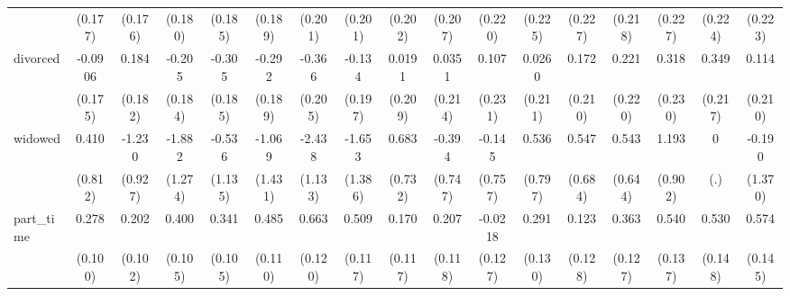 {\begin{tabular}{l*{16}{c}}
                    &     (0.177)         &     (0.176)         &     (0.180)         &     (0.185)         &     (0.189)         &     (0.201)         &     (0.201)         &     (0.202)         &     (0.207)         &     (0.220)         &     (0.225)         &     (0.227)         &     (0.218)         &     (0.227)         &     (0.224)         &     (0.223)         \\
[1em]
divorced            &     -0.0906         &       0.184         &      -0.205         &      -0.305         &      -0.292         &      -0.366         &      -0.134         &      0.0191         &      0.0351         &       0.107         &      0.0260         &       0.172         &       0.221         &       0.318         &       0.349         &       0.114         \\
                    &     (0.175)         &     (0.182)         &     (0.184)         &     (0.185)         &     (0.189)         &     (0.205)         &     (0.197)         &     (0.209)         &     (0.214)         &     (0.231)         &     (0.211)         &     (0.210)         &     (0.220)         &     (0.230)         &     (0.217)         &     (0.210)         \\
[1em]
widowed             &       0.410         &      -1.230         &      -1.882         &      -0.536         &      -1.069         &      -2.438\sym{*}  &      -1.653         &       0.683         &      -0.394         &      -0.145         &       0.536         &       0.547         &       0.543         &       1.193         &           0         &      -0.190         \\
                    &     (0.812)         &     (0.927)         &     (1.274)         &     (1.135)         &     (1.431)         &     (1.133)         &     (1.386)         &     (0.732)         &     (0.747)         &     (0.757)         &     (0.797)         &     (0.684)         &     (0.644)         &     (0.902)         &         (.)         &     (1.370)         \\
[1em]
part\_time           &       0.278\sym{**} &       0.202\sym{*}  &       0.400\sym{***}&       0.341\sym{**} &       0.485\sym{***}&       0.663\sym{***}&       0.509\sym{***}&       0.170         &       0.207         &     -0.0218         &       0.291\sym{*}  &       0.123         &       0.363\sym{**} &       0.540\sym{***}&       0.530\sym{***}&       0.574\sym{***}\\
                    &     (0.100)         &     (0.102)         &     (0.105)         &     (0.105)         &     (0.110)         &     (0.120)         &     (0.117)         &     (0.117)         &     (0.118)         &     (0.127)         &     (0.130)         &     (0.128)         &     (0.127)         &     (0.137)         &     (0.148)         &     (0.145)         \\

\end{tabular}}
